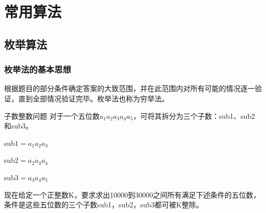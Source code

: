 \section{常用算法}

\subsection{枚举算法}

\begin{frame}
    \frametitle{枚举法的基本思想}
    根据题目的部分条件确定答案的大致范围，并在此范围内对所有可能的情况逐一验证，直到全部情况验证完毕。枚举法也称为穷举法。
    \begin{block}{子数整数问题}
      对于一个五位数$a_1a_2a_3a_4a_5$，可将其拆分为三个子数：sub1、sub2和sub3。

      sub$1=a_1a_2a_3$

      sub$2=a_2a_3a_4$

      sub$3=a_3a_4a_5$

      现在给定一个正整数K，要求求出10000到30000之间所有满足下述条件的五位数，条件是这些五位数的三个子数sub1，sub2，sub3都可被K整除。
    \end{block}
\end{frame}


